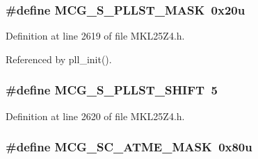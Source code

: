 \subsubsection[{\texorpdfstring{M\+C\+G\+\_\+\+S\+\_\+\+P\+L\+L\+S\+T\+\_\+\+M\+A\+SK}{MCG_S_PLLST_MASK}}]{\setlength{\rightskip}{0pt plus 5cm}\#define M\+C\+G\+\_\+\+S\+\_\+\+P\+L\+L\+S\+T\+\_\+\+M\+A\+SK~0x20u}\hypertarget{group___m_c_g___register___masks_ga6f176d95968a5b7b1af67ae81734c854}{}\label{group___m_c_g___register___masks_ga6f176d95968a5b7b1af67ae81734c854}


Definition at line 2619 of file M\+K\+L25\+Z4.\+h.



Referenced by pll\+\_\+init().

\subsubsection[{\texorpdfstring{M\+C\+G\+\_\+\+S\+\_\+\+P\+L\+L\+S\+T\+\_\+\+S\+H\+I\+FT}{MCG_S_PLLST_SHIFT}}]{\setlength{\rightskip}{0pt plus 5cm}\#define M\+C\+G\+\_\+\+S\+\_\+\+P\+L\+L\+S\+T\+\_\+\+S\+H\+I\+FT~5}\hypertarget{group___m_c_g___register___masks_gafddddab311f8f0cb58e7b7941f6d9a8d}{}\label{group___m_c_g___register___masks_gafddddab311f8f0cb58e7b7941f6d9a8d}


Definition at line 2620 of file M\+K\+L25\+Z4.\+h.

\subsubsection[{\texorpdfstring{M\+C\+G\+\_\+\+S\+C\+\_\+\+A\+T\+M\+E\+\_\+\+M\+A\+SK}{MCG_SC_ATME_MASK}}]{\setlength{\rightskip}{0pt plus 5cm}\#define M\+C\+G\+\_\+\+S\+C\+\_\+\+A\+T\+M\+E\+\_\+\+M\+A\+SK~0x80u}\hypertarget{group___m_c_g___register___masks_gaf9545e815c86bd04d8513af024cb8617}{}\label{group___m_c_g___register___masks_gaf9545e815c86bd04d8513af024cb8617}


